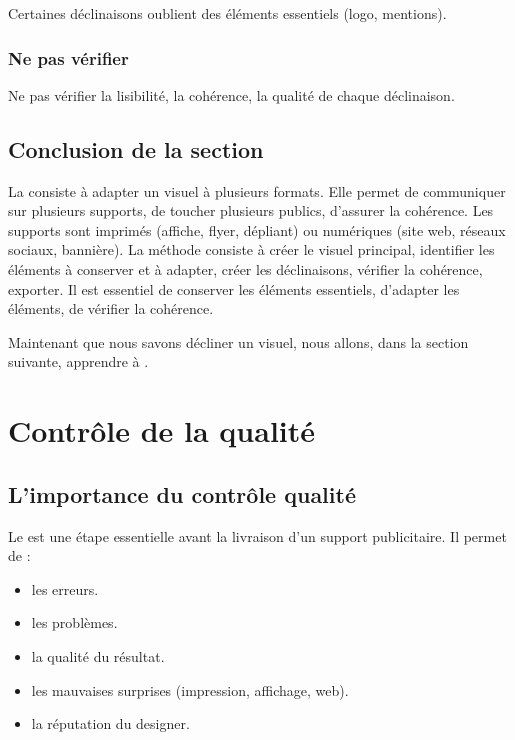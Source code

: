 Certaines déclinaisons oublient des éléments essentiels (logo, mentions).

\subsubsection{Ne pas vérifier}

Ne pas vérifier la lisibilité, la cohérence, la qualité de chaque déclinaison.

\subsection*{Conclusion de la section}

La  consiste à adapter un visuel à plusieurs formats. Elle permet de communiquer sur plusieurs supports, de toucher plusieurs publics, d'assurer la cohérence. Les supports sont imprimés (affiche, flyer, dépliant) ou numériques (site web, réseaux sociaux, bannière). La méthode consiste à créer le visuel principal, identifier les éléments à conserver et à adapter, créer les déclinaisons, vérifier la cohérence, exporter. Il est essentiel de conserver les éléments essentiels, d'adapter les éléments, de vérifier la cohérence.

Maintenant que nous savons décliner un visuel, nous allons, dans la section suivante, apprendre à .

\section{Contrôle de la qualité}

\subsection{L'importance du contrôle qualité}

Le  est une étape essentielle avant la livraison d'un support publicitaire. Il permet de :

\begin{itemize}
    \item {} les erreurs.
    \item {} les problèmes.
    \item {} la qualité du résultat.
    \item {} les mauvaises surprises (impression, affichage, web).
    \item {} la réputation du designer.
\end{itemize}

